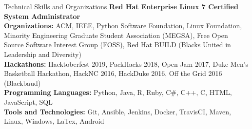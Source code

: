 \documentclass{resume} %
\begin{document}
\begin{rSection}{Technical Skills and Organizations}
\textbf{Red Hat Enterprise Linux 7 Certified System Administrator} \\
\textbf{Organizations:} ACM, IEEE, Python Software Foundation, Linux Foundation, Minority Engineering Graduate Student Association (MEGSA), Free Open Source Software Interest Group (FOSS), Red Hat BUILD (Blacks United in Leadership and Diversity) \\
\textbf{Hackathons:} Hacktoberfest 2019, PackHacks 2018, Open Jam 2017, Duke Men's Basketball Hackathon, HackNC 2016, HackDuke 2016, Off the Grid 2016 (Blackbaud) \\
\textbf{Programming Languages:} Python, Java, R, Ruby, C\#, C++, C, HTML, JavaScript, SQL \\
\textbf{Tools and Technologies:} Git, Ansible, Jenkins, Docker, TravisCI, Maven, Linux, Windows, LaTex, Android
\end{rSection}
\vspace{-8pt}
\end{document}
